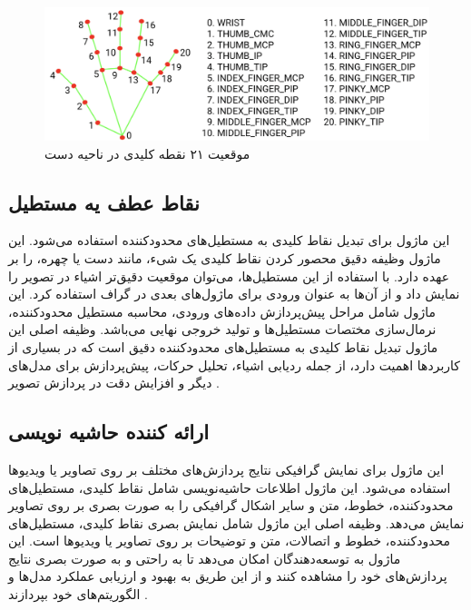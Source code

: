 \begin{figure}[h]
    \centering
    \includegraphics[width=1\textwidth]{hand-landmarks.png}
    \caption{موقعیت ۲۱ نقطه کلیدی در ناحیه دست}
\end{figure}



\subsection{نقاط عطف یه مستطیل \protect{}}
این ماژول برای تبدیل نقاط کلیدی به مستطیل‌های محدودکننده استفاده می‌شود. این ماژول وظیفه دقیق محصور کردن نقاط کلیدی یک شیء، مانند دست یا چهره، را بر عهده دارد. با استفاده از این مستطیل‌ها، می‌توان موقعیت دقیق‌تر اشیاء در 
تصویر را نمایش داد و از آن‌ها به عنوان ورودی برای ماژول‌های بعدی در گراف استفاده کرد. این ماژول شامل مراحل پیش‌پردازش داده‌های ورودی، محاسبه مستطیل محدودکننده، نرمال‌سازی مختصات مستطیل‌ها و تولید خروجی نهایی 
می‌باشد. وظیفه اصلی این ماژول تبدیل نقاط کلیدی به مستطیل‌های محدودکننده دقیق است که در بسیاری از کاربردها اهمیت دارد، از جمله ردیابی اشیاء، تحلیل حرکات، پیش‌پردازش برای مدل‌های دیگر و افزایش دقت در پردازش تصویر .
\cite{zhang2020mediapipe}


\subsection{ارائه کننده حاشیه نویسی \protect{}}
این ماژول برای نمایش گرافیکی نتایج پردازش‌های مختلف بر روی تصاویر یا ویدیوها استفاده می‌شود. این ماژول اطلاعات حاشیه‌نویسی شامل نقاط کلیدی، مستطیل‌های محدودکننده، خطوط، متن و سایر اشکال گرافیکی را به صورت 
بصری بر روی تصاویر نمایش می‌دهد. وظیفه اصلی این ماژول شامل نمایش بصری نقاط کلیدی، مستطیل‌های محدودکننده، خطوط و اتصالات، متن و توضیحات بر روی تصاویر یا ویدیوها است. این ماژول به توسعه‌دهندگان امکان 
می‌دهد تا به راحتی و به صورت بصری نتایج پردازش‌های خود را مشاهده کنند و از این طریق به بهبود و ارزیابی عملکرد مدل‌ها و الگوریتم‌های خود بپردازند .
\cite{zhang2020mediapipe}













